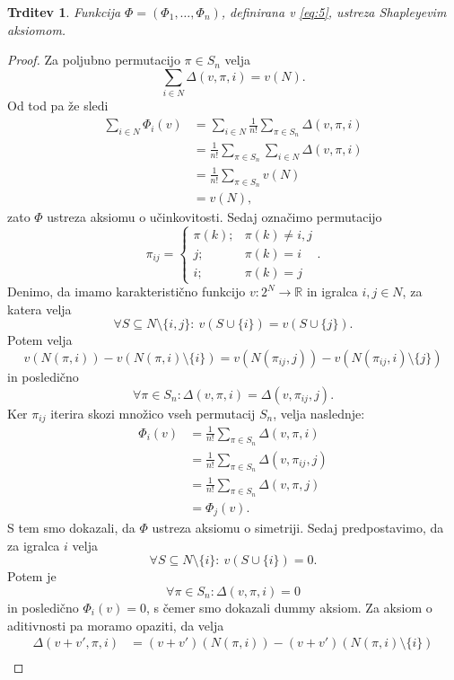 \documentclass[10pt, a4paper]{article}
\newtheorem{trditev}[izr]{Trditev}
\newenvironment{noticeC}{%
  \tcolorbox[%
  notitle,
  empty,
  enhanced,  %
  breakable,
  coltext=black, 
  fontupper=\rmfamily,
  noparskip,
  sharp corners,
  boxrule=-1pt,  %
  frame hidden,
  left=7pt,  %
  right=7pt,
  top=5pt,
  bottom=5pt,
  before skip=2.5ex plus 2pt,
  after skip=2.5ex plus 2pt,
  overlay unbroken and last={%
  },
  ]}
{\endtcolorbox}
\newenvironment{dokaz}%
  {\begin{noticeC}\begin{proof}}%
  {\end{proof}\end{noticeC}}
\newcommand{\R}{\mathbb {R}}
\begin{document}
\begin{trditev}
  Funkcija $\Phi = (\Phi_1, \dots, \Phi_n)$, definirana v \eqref{eq:5}, ustreza Shapleyevim aksiomom.
\end{trditev}

\begin{dokaz}
  Za poljubno permutacijo $\pi \in S_n$ velja 
  $$\sum_{i \in N} \Delta(v, \pi, i) = v(N).$$
  Od tod pa že sledi 
  \begin{align*}
    \sum_{i \in N} \Phi_i (v) &= \sum_{i \in N} \frac{1}{n!} \sum_{\pi \in S_n} \Delta (v, \pi, i)\\
    &= \frac{1}{n!} \sum_{\pi \in S_n} \sum_{i \in N} \Delta (v, \pi, i)\\
    &= \frac{1}{n!} \sum_{\pi \in S_n} v(N)\\
    &= v(N),
  \end{align*}
  zato $\Phi$ ustreza aksiomu o učinkovitosti.
  Sedaj označimo permutacijo $$\pi_{ij} = \begin{cases}
    \pi(k);& \pi(k) \neq i, j\\
    j;& \pi(k) = i\\
    i;& \pi(k) = j
  \end{cases}.$$
  Denimo, da imamo karakteristično funkcijo $v: 2^N \to \R$
  in igralca $i, j \in N$, za katera velja 
  $$\forall S \subseteq N \setminus \{i, j\}:\ v(S \cup \{i\}) = v(S \cup \{j\}).$$
  Potem velja 
  $$v(N(\pi, i)) - v(N(\pi, i) \setminus \{i\}) = v(N(\pi_{ij}, j)) - v(N(\pi_{ij}, i) \setminus \{j\})$$
  in posledično
  $$\forall \pi \in S_n: \Delta(v, \pi, i) = \Delta(v, \pi_{ij}, j).$$
  Ker $\pi_{ij}$ iterira skozi množico vseh permutacij $S_n$, velja naslednje:
  \begin{align*}
    \Phi_i (v) &= \frac{1}{n!} \sum_{\pi \in S_n} \Delta(v, \pi, i)\\
    &= \frac{1}{n!} \sum_{\pi \in S_n} \Delta (v, \pi_{ij}, j)\\
    &= \frac{1}{n!} \sum_{\pi \in S_n} \Delta (v, \pi, j)\\
    &= \Phi_j (v).
  \end{align*}
  S tem smo dokazali, da $\Phi$ ustreza aksiomu o simetriji.
  Sedaj predpostavimo, da za igralca $i$ velja 
  $$\forall S \subseteq N \setminus \{i\}:\ v(S \cup \{i\}) = 0.$$
  Potem je 
  $$\forall \pi \in S_n: \Delta(v, \pi, i) = 0$$ in posledično $\Phi_i (v) = 0$,
  s čemer smo dokazali dummy aksiom.
  Za aksiom o aditivnosti pa moramo opaziti, da velja 
  \begin{align*}
    \Delta(v + v', \pi, i) &= (v + v') (N(\pi, i)) - (v + v')(N(\pi, i) \setminus \{i\})\\

\end{align*}
\end{dokaz}
\end{document}
